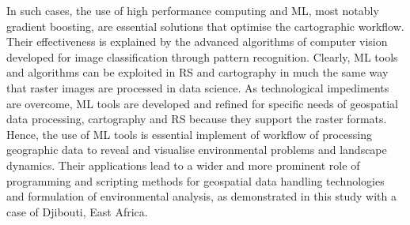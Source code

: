 \documentclass[jimaging,article,submit,pdftex,moreauthors]{Definitions/mdpi}
\begin{document}
In such cases, the use of high performance computing and ML, most notably gradient boosting, are essential solutions that optimise the cartographic workflow. Their effectiveness is explained by the advanced algorithms of computer vision developed for image classification through pattern recognition. Clearly, ML tools and algorithms can be exploited in RS and cartography in much the same way that raster images are processed in data science. As technological impediments are overcome, ML tools are developed and refined for specific needs of geospatial data processing, cartography and RS because they support the raster formats. Hence, the use of ML tools is essential implement of workflow of processing geographic data to reveal and visualise environmental problems and landscape dynamics. Their applications lead to a wider and more prominent role of programming and scripting methods for geospatial data handling technologies and formulation of environmental analysis, as demonstrated in this study with a case of Djibouti, East Africa.







\end{document}
